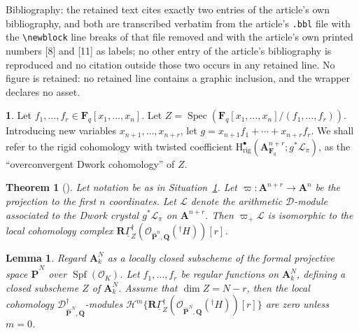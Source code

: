 \documentclass[10pt,a4paper]{amsart}
\numberwithin{equation}{section}
\renewcommand{\mathbb}{\mathbf}
\theoremstyle{plain}
\newtheorem{theorem}[equation]{Theorem}
\newtheorem{lemma}[equation]{Lemma}
\theoremstyle{definition}
\newtheorem{situation}[equation]{}
\theoremstyle{plain}
\begin{document}
Bibliography: the retained text cites exactly two entries of the article's own bibliography, and both are transcribed verbatim from the article's \texttt{.bbl} file with the \texttt{\textbackslash newblock} line breaks of that file removed and with the article's own printed numbers [8] and [11] as labels; no other entry of the article's bibliography is reproduced and no citation outside those two occurs in any retained line. No figure is retained: no retained line contains a graphic inclusion, and the wrapper declares no asset.
\begin{situation}\label{situation}%
Let \(f_{1},\ldots,f_{r} \in \mathbb{F}_{q}[x_{1},\ldots,x_{n}]\).
Let
\(Z=\operatorname{Spec}(\mathbb{F}_{q}[x_{1},\ldots,x_{n}]/(f_{1},\ldots,f_{r}))\).
Introducing new variables \(x_{n+1},\ldots,x_{n+r}\), let
\(g = x_{n+1}f_{1} + \cdots + x_{n+r}f_{r}\).  We shall refer to the
rigid cohomology with twisted coefficient
\(\mathrm{H}^{\bullet}_{\mathrm{rig}}(\mathbb{A}_{\mathbb{F}_{q}}^{n+r};g^{\ast}\mathcal{L}_{\pi})\),
as the ``overconvergent Dwork cohomology'' of \(Z\).
\end{situation}

\setcounter{equation}{17}
\begin{theorem}[{\cite[Theorem~2.14]{baldassarri-berthelot:dwork-cohomology-for-singular-hypersurfaces}}]%
\label{theorem:local-comparison}
Let notation be as in Situation~\ref{situation}.  Let
\(\varpi\colon \mathbb{A}^{n+r} \to \mathbb{A}^{n}\) be the projection
to the first \(n\) coordinates.  Let \(\mathcal{L}\) denote the
arithmetic \(\mathscr{D}\)-module associated to the Dwork crystal
\(g^{\ast}\mathcal{L}_{\pi}\) on \(\mathbb{A}^{n+r}\).  Then \(\varpi_{+}\mathcal{L}\) is
isomorphic to the local cohomology complex
\(\mathbb{R}\underline{\Gamma}_{Z}^{\dagger}(\mathcal{O}_{\widehat{\mathbb{P}}^{n},\mathbb{Q}}({}^{\dagger}H))[r]\).
\end{theorem}

\setcounter{section}{5}\setcounter{equation}{5}
\begin{lemma}\label{lemma:local-cohomology}
Regard \(\mathbb{A}^{N}_{k}\) as a locally closed subscheme of the
formal projective space \(\widehat{\mathbb{P}}^{N}\) over
\(\operatorname{Spf}(\mathcal{O}_{K})\).  Let \(f_{1},\ldots, f_{r}\)
be regular functions on \(\mathbb{A}^{N}_{k}\), defining a closed
subscheme \(Z\) of \(\mathbb{A}^{N}_{k}\).  Assume that
\(\dim Z = N-r\), then the local cohomology
\(\mathscr{D}^{\dagger}_{\widehat{\mathbb{P}}^{N},\mathbb{Q}}\)-modules
\(\mathcal{H}^{m}\{\mathbb{R}\underline{\Gamma}_{Z}^{\dagger}(\mathcal{O}_{\widehat{\mathbb{P}}^{N},\mathbb{Q}}({}^{\dagger}H))[r]\}\)
are zero unless \(m = 0\).
\end{lemma}
\end{document}
